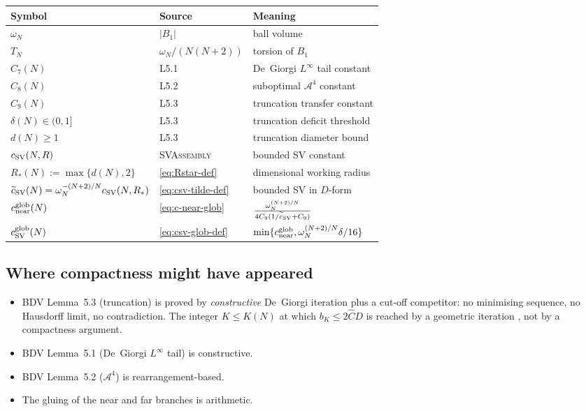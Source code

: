 \documentclass[11pt]{article}
\theoremstyle{definition}
\newcommand{\Fr}{\mathcal{A}}
\begin{document}
\renewcommand{\arraystretch}{1.25}
\begin{center}
\begin{tabular}{|l|l|l|}\hline
Symbol & Source & Meaning \\\hline
$\omega_{N}$ & $|B_{1}|$ & ball volume \\
$T_{N}$ & $\omega_{N}/(N(N+2))$ & torsion of $B_{1}$ \\
$C_{7}(N)$ & \cite{BDV} L5.1 & De~Giorgi $L^{\infty}$ tail constant \\
$C_{8}(N)$ & \cite{BDV} L5.2 & suboptimal $\Fr^{4}$ constant \\
$C_{9}(N)$ & \cite{BDV} L5.3 & truncation transfer constant \\
$\delta(N)\in(0,1]$ & \cite{BDV} L5.3 & truncation deficit threshold \\
$d(N)\ge 1$ & \cite{BDV} L5.3 & truncation diameter bound \\
$c_{\rm SV}(N,R)$ & \textsc{SVAssembly} & bounded SV constant \\\hline
$R_{*}(N):=\max\{d(N),2\}$ & \eqref{eq:Rstar-def} & dimensional working radius \\
$\widetilde c_{\rm SV}(N)=\omega_{N}^{-(N+2)/N}c_{\rm SV}(N,R_{*})$
   & \eqref{eq:csv-tilde-def} & bounded SV in $D$-form \\
$c_{\rm near}^{\rm glob}(N)$
   & \eqref{eq:c-near-glob}
   & $\frac{\omega_{N}^{(N+2)/N}}{4C_{9}(1/\widetilde c_{\rm SV}+C_{9})}$\\
$c_{\rm SV}^{\rm glob}(N)$
   & \eqref{eq:csv-glob-def}
   & $\min\{c_{\rm near}^{\rm glob},\omega_{N}^{(N+2)/N}\delta/16\}$\\\hline
\end{tabular}
\end{center}

\subsection*{Where compactness might have appeared}

\begin{itemize}
\item BDV Lemma~5.3 (truncation) is proved by \emph{constructive}
De~Giorgi iteration plus a cut-off competitor: no minimising sequence,
no Hausdorff limit, no contradiction. The integer $K\le K(N)$ at
which $b_{K}\le 2\widehat C D$ is reached by a geometric iteration
\cite[(5.12)--(5.14)]{BDV}, not by a compactness argument.
\item BDV Lemma~5.1 (De~Giorgi $L^{\infty}$ tail) is constructive.
\item BDV Lemma~5.2 ($\Fr^{4}$) is rearrangement-based.
\item The gluing of the near and far branches is arithmetic.
\end{itemize}
\end{document}
